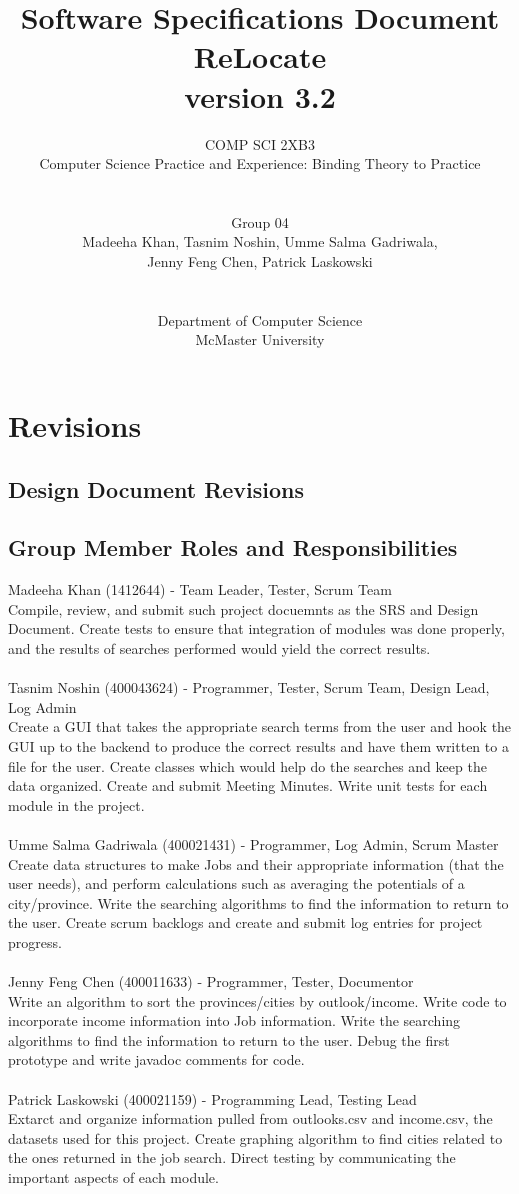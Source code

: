 \documentclass[12pt,fleqn]{article}
\title{Software Specifications Document \\ReLocate\\version 3.2}
\author{COMP SCI 2XB3\\  
Computer Science Practice and Experience: Binding Theory to Practice\\ \\ \\
Group 04\\Madeeha Khan, Tasnim Noshin, Umme Salma Gadriwala,\\ 
Jenny Feng Chen, Patrick Laskowski \\ \\ \\
Department of Computer Science\\ 
McMaster University}
\begin{document}
\maketitle

\newpage
\section*{Revisions}\label{revisions}
\subsection*{Design Document Revisions}

\subsection*{Group Member Roles and Responsibilities}
Madeeha Khan (1412644)  - Team Leader, Tester, Scrum Team 
\\ \indent Compile, review, and submit such project docuemnts as the SRS and Design Document. Create tests to ensure that integration of modules was done properly, and the results of searches performed would yield the correct results.
\\
\\
Tasnim Noshin (400043624)  - Programmer, Tester, Scrum Team, Design Lead, Log Admin
\\ \indent Create a GUI that takes the appropriate search terms from the user and hook the GUI up to the backend to produce the correct results and have them written to a file for the user. Create classes which would help do the searches and keep the data organized. Create and submit Meeting Minutes. Write unit tests for each module in the project.
\\
\\
Umme Salma Gadriwala (400021431)  - Programmer, Log Admin, Scrum Master
\\ \indent Create data structures to make Jobs and their appropriate information (that the user needs), and perform calculations such as averaging the potentials of a city/province. Write the searching algorithms to find the information to return to the user. Create scrum backlogs and create and submit log entries for project progress. 
\\
\\
Jenny Feng Chen (400011633)  - Programmer, Tester, Documentor
\\ \indent Write an algorithm to sort the provinces/cities by outlook/income. Write code to incorporate income information into Job information. Write the searching algorithms to find the information to return to the user. Debug the first prototype and write javadoc comments for code.
\\
\\
Patrick Laskowski (400021159)  - Programming Lead, Testing Lead
\\ \indent Extarct and organize information pulled from outlooks.csv and income.csv, the datasets used for this project. Create graphing algorithm to find cities related to the ones returned in the job search. Direct testing by communicating the important aspects of each module.
\end{document}
